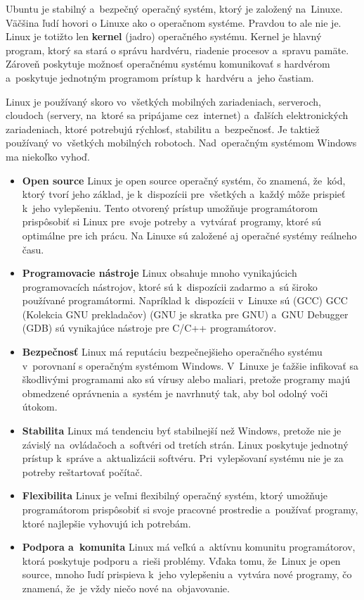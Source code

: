 Ubuntu je stabilný a~bezpečný operačný systém, ktorý je založený na~Linuxe. Väčšina ľudí hovori o Linuxe ako o operačnom systéme. Pravdou
to ale nie je. Linux je totižto len \textbf{kernel} (jadro) operačného systému. Kernel je hlavný program, ktorý sa stará o správu hardvéru,
riadenie procesov a~spravu pamäte. Zároveň poskytuje možnosť operačnému systému komunikovať s hardvérom a~poskytuje jednotným programom
prístup k~hardvéru a~jeho častiam.

Linux je používaný skoro vo~všetkých mobilných zariadeniach, serveroch, cloudoch (servery, na~ktoré sa pripájame cez~internet) a~ďalších
elektronických zariadeniach, ktoré potrebujú rýchlosť, stabilitu a~bezpečnosť. Je taktiež používaný vo~všetkých mobilných robotoch.
Nad~operačným systémom Windows ma niekoľko vyhoď.

\begin{itemize}
	\item \textbf{Open source} Linux je open source operačný systém, čo znamená, že~kód, ktorý tvorí jeho základ, je k~dispozícii
		pre~všetkých a~každý môže prispieť k~jeho vylepšeniu. Tento otvorený prístup umožňuje programátorom prispôsobiť si Linux
		pre~svoje potreby a~vytvárať programy, ktoré sú optimálne pre ich prácu. Na Linuxe sú založené aj operačné systémy
		reálneho času.

	\item \textbf{Programovacie nástroje} Linux obsahuje mnoho vynikajúcich programovacích nástrojov, ktoré sú k~dispozícii zadarmo
		a~sú široko používané programátormi. Napríklad k~dispozícii v~Linuxe sú (GCC) \acrlong{GCC} (Kolekcia GNU prekladačov)
		(GNU je skratka pre \acrlong{GNU}) a~GNU Debugger (GDB) sú vynikajúce nástroje pre C/C++ programátorov.

	\item \textbf{Bezpečnosť} Linux má reputáciu bezpečnejšieho operačného systému v~porovnaní s operačným systémom Windows.
		V~Linuxe je ťažšie infikovať sa škodlivými programami ako sú vírusy alebo maliari, pretože programy majú obmedzené
		oprávnenia a~systém je navrhnutý tak, aby bol odolný voči útokom.

	\item \textbf{Stabilita} Linux má tendenciu byť stabilnejší než Windows, pretože nie je závislý na~ovládačoch a~softvéri
		od tretích strán. Linux poskytuje jednotný prístup k~správe a~aktualizácii softvéru. Pri~vylepšovaní systému nie je
		za potreby reštartovať počítač.

	\item \textbf{Flexibilita} Linux je veľmi flexibilný operačný systém, ktorý umožňuje programátorom prispôsobiť si svoje pracovné
		prostredie a~používať programy, ktoré najlepšie vyhovujú ich potrebám.

	\item \textbf{Podpora a~komunita} Linux má veľkú a~aktívnu komunitu programátorov, ktorá poskytuje podporu a~rieši problémy.
		Vďaka tomu, že~Linux je open source, mnoho ľudí prispieva k~jeho vylepšeniu a~vytvára nové programy, čo znamená, že~je vždy
		niečo nové na~objavovanie.
\end{itemize}

